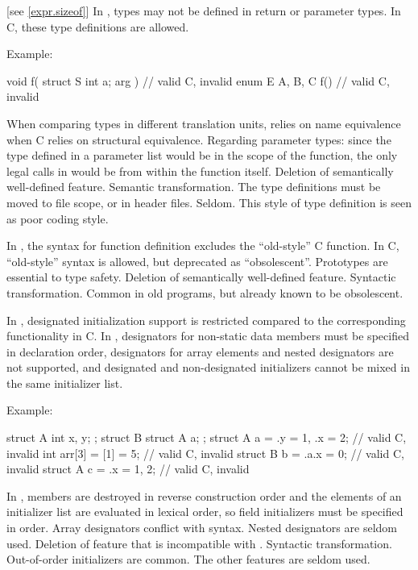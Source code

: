  [see \ref{expr.sizeof}]
\change
In \Cpp{}, types may not be defined in return or parameter types.
In C, these type definitions are allowed.

Example:

\begin{codeblock}
void f( struct S { int a; } arg ) {}    // valid C, invalid \Cpp{}
enum E { A, B, C } f() {}               // valid C, invalid \Cpp{}
\end{codeblock}

\rationale
When comparing types in different translation units, \Cpp{} relies
on name equivalence when C relies on structural equivalence.
Regarding parameter types: since the type defined in a parameter list
would be in the scope of the function, the only legal calls in \Cpp{}
would be from within the function itself.
\effect
Deletion of semantically well-defined feature.
\difficulty
Semantic transformation.
The type definitions must be moved to file scope, or in header files.
\howwide
Seldom.
This style of type definition is seen as poor coding style.

\change
In \Cpp{}, the syntax for function definition excludes the ``old-style'' C function.
In C, ``old-style'' syntax is allowed, but deprecated as ``obsolescent''.
\rationale
Prototypes are essential to type safety.
\effect
Deletion of semantically well-defined feature.
\difficulty
Syntactic transformation.
\howwide
Common in old programs, but already known to be obsolescent.

\change
In \Cpp{}, designated initialization support is restricted
compared to the corresponding functionality in C\@.
In \Cpp{},
designators for non-static data members
must be specified in declaration order,
designators for array elements and nested designators
are not supported,
and
designated and non-designated initializers
cannot be mixed in the same initializer list.

Example:
\begin{codeblock}
struct A { int x, y; };
struct B { struct A a; };
struct A a = {.y = 1, .x = 2};  // valid C, invalid \Cpp{}
int arr[3] = {[1] = 5};         // valid C, invalid \Cpp{}
struct B b = {.a.x = 0};        // valid C, invalid \Cpp{}
struct A c = {.x = 1, 2};       // valid C, invalid \Cpp{}
\end{codeblock}
\rationale
In \Cpp{}, members are destroyed in reverse construction order
and the elements of an initializer list are evaluated in lexical order,
so field initializers must be specified in order.
Array designators conflict with  syntax.
Nested designators are seldom used.
\effect
Deletion of feature that is incompatible with \Cpp{}.
\difficulty
Syntactic transformation.
\howwide
Out-of-order initializers are common.
The other features are seldom used.

